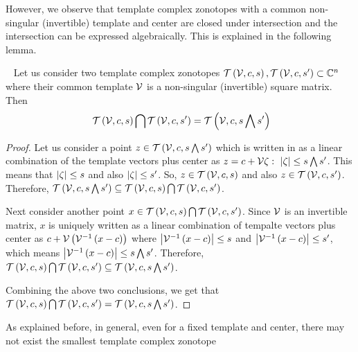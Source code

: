 However, we observe that template complex zonotopes with a common
non-singular (invertible) template and center are closed under
intersection and the intersection can be expressed algebraically.
This is explained in the following lemma.
%
\begin{lemma}~\label{lem:intersection}
Let us consider two template complex zonotopes
$\mathit{\mathcal{T}}\left(\mathcal{V},c,s\right),\mathit{\mathcal{T}}\left(\mathcal{V},c,s^\prime\right)\subset\mathbb{C}^n$
where their common template $\mathcal{V}$ is a non-singular (invertible)
square matrix.  Then
%
\begin{equation}~\label{eqn:intersection}
\mathit{\mathcal{T}}\left(\mathcal{V},c,s\right)\bigcap\mathit{\mathcal{T}}\left(\mathcal{V},c,s^\prime\right)=\mathit{\mathcal{T}}\left(\mathcal{V},c,s\bigwedge s^\prime\right)
\end{equation}
%
\end{lemma}
%
\begin{proof}
Let us consider a point
$z\in\mathit{\mathcal{T}}\left(\mathcal{V},c,s\bigwedge s^\prime\right)$ which is
written in as a linear combination of the template vectors plus center
as $z=c+\mathcal{V}\zeta:~\left|\zeta\right|\leq s\bigwedge s^\prime$.
This means that $\left|\zeta\right|\leq s$ and also
$\left|\zeta\right|\leq s^\prime$.  So,
$z\in\mathit{\mathcal{T}}\left(\mathcal{V},c,s\right)$ and also
$z\in\mathit{\mathcal{T}}\left(\mathcal{V},c,s^\prime\right)$.  Therefore,
$\mathit{\mathcal{T}}\left(\mathcal{V},c,s\bigwedge s^\prime\right)\subseteq \mathit{\mathcal{T}}\left(\mathcal{V},c,s\right)\bigcap\mathit{\mathcal{T}}\left(\mathcal{V},c,s^\prime\right)$.

Next consider another point
$x\in\mathit{\mathcal{T}}\left(\mathcal{V},c,s\right)\bigcap\mathit{\mathcal{T}}\left(\mathcal{V},c,s^\prime\right)$.
Since $\mathcal{V}$ is an invertible matrix, $x$ is uniquely written as a
linear combination of tempalte vectors plus center as
$c+\mathcal{V}\left(\mathcal{V}^{-1}\left(x-c\right)\right)$ where
$\left|\mathcal{V}^{-1}\left(x-c\right)\right|\leq
s$ and $\left|\mathcal{V}^{-1}\left(x-c\right)\right|\leq
s^\prime$, which means
$\left|\mathcal{V}^{-1}\left(x-c\right)\right|\leq s\bigwedge s^\prime$.  Therefore,
$\mathit{\mathcal{T}}\left(\mathcal{V},c,s\right)\bigcap\mathit{\mathcal{T}}\left(\mathcal{V},c,s^\prime\right)\subseteq\mathit{\mathcal{T}}\left(\mathcal{V},c,s\bigwedge s^\prime\right)$.

Combining the above two conclusions, we get that
$\mathit{\mathcal{T}}\left(\mathcal{V},c,s\right)\bigcap\mathit{\mathcal{T}}\left(\mathcal{V},c,s^\prime\right)=\mathit{\mathcal{T}}\left(\mathcal{V},c,s\bigwedge s^\prime\right)$.

\end{proof}
%
As explained before, in general, even for a fixed template and center,
there may not exist the smallest template complex zonotope
